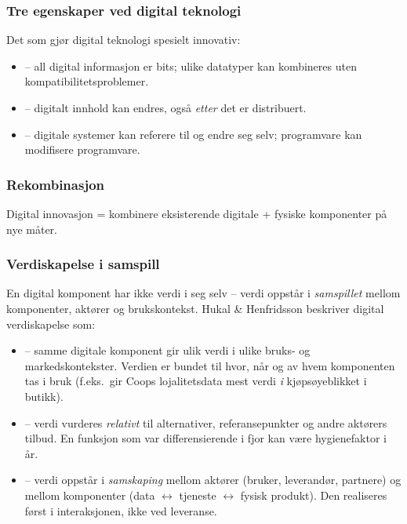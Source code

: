 \subsubsection*{Tre egenskaper ved digital teknologi}
Det som gjør digital teknologi spesielt innovativ:
\begin{itemize}
  \item {} -- all digital informasjon er bits; ulike
    datatyper kan kombineres uten kompatibilitetsproblemer.
  \item {} -- digitalt innhold kan endres, også \emph{etter} det
    er distribuert.
  \item {} -- digitale systemer kan referere til og
    endre seg selv; programvare kan modifisere programvare.
\end{itemize}

\subsubsection*{Rekombinasjon}
Digital innovasjon = kombinere eksisterende digitale + fysiske komponenter på
nye måter. 

\subsubsection*{Verdiskapelse i samspill}
En digital komponent har ikke verdi i seg selv -- verdi oppstår i \emph{samspillet}
mellom komponenter, aktører og brukskontekst. Hukal \& Henfridsson beskriver
digital verdiskapelse som:
\begin{itemize}
  \item {} -- samme digitale komponent gir ulik verdi i ulike
    bruks- og markedskontekster. Verdien er bundet til hvor, når og av hvem
    komponenten tas i bruk (f.eks.\ gir Coops lojalitetsdata mest verdi
    \emph{i} kjøpsøyeblikket i butikk).
  \item {} -- verdi vurderes \emph{relativt} til alternativer,
    referansepunkter og andre aktørers tilbud. En funksjon som var
    differensierende i fjor kan være hygienefaktor i år.
  \item {} -- verdi oppstår i \emph{samskaping} mellom
    aktører (bruker, leverandør, partnere) og mellom komponenter
    (data $\leftrightarrow$ tjeneste $\leftrightarrow$ fysisk produkt). Den
    realiseres først i interaksjonen, ikke ved leveranse.
\end{itemize}

